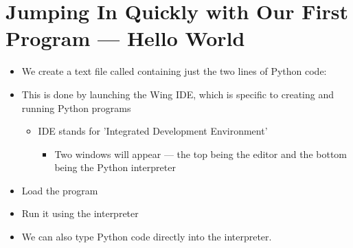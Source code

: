 \documentclass[letterpaper,10pt,english]{sphinxmanual}
\begin{document}
\section{Jumping In Quickly with Our First Program — Hello World}
\label{\detokenize{lecture_notes/lec01_intro:jumping-in-quickly-with-our-first-program-hello-world}}\begin{itemize}
\item {} 
We create a text file called  containing just the two lines of Python code:

\begin{sphinxVerbatim}[commandchars=\\\{\}]
\end{sphinxVerbatim}

\item {} 
This is done by launching the Wing IDE, which is specific to creating
and running Python programs
\begin{itemize}
\item {} 
IDE stands for ’Integrated Development Environment’
\begin{itemize}
\item {} 
Two windows will appear — the top being the editor and the bottom
being the Python interpreter

\end{itemize}

\end{itemize}

\item {} 
Load the  program

\item {} 
Run it using the interpreter

\item {} 
We can also type Python code directly into the interpreter.

\end{itemize}
\end{document}
